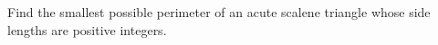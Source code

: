Find the smallest possible perimeter of an acute scalene triangle whose side lengths are positive integers.
